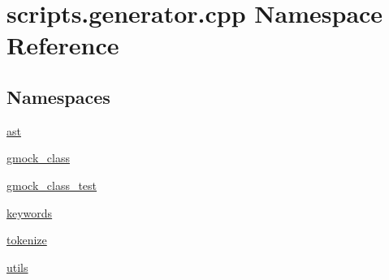 \hypertarget{namespacescripts_1_1generator_1_1cpp}{}\section{scripts.\+generator.\+cpp Namespace Reference}
\label{namespacescripts_1_1generator_1_1cpp}
\subsection*{Namespaces}
\begin{DoxyCompactItemize}
\item 
 \mbox{\hyperlink{namespacescripts_1_1generator_1_1cpp_1_1ast}{ast}}
\item 
 \mbox{\hyperlink{namespacescripts_1_1generator_1_1cpp_1_1gmock__class}{gmock\+\_\+class}}
\item 
 \mbox{\hyperlink{namespacescripts_1_1generator_1_1cpp_1_1gmock__class__test}{gmock\+\_\+class\+\_\+test}}
\item 
 \mbox{\hyperlink{namespacescripts_1_1generator_1_1cpp_1_1keywords}{keywords}}
\item 
 \mbox{\hyperlink{namespacescripts_1_1generator_1_1cpp_1_1tokenize}{tokenize}}
\item 
 \mbox{\hyperlink{namespacescripts_1_1generator_1_1cpp_1_1utils}{utils}}
\end{DoxyCompactItemize}

